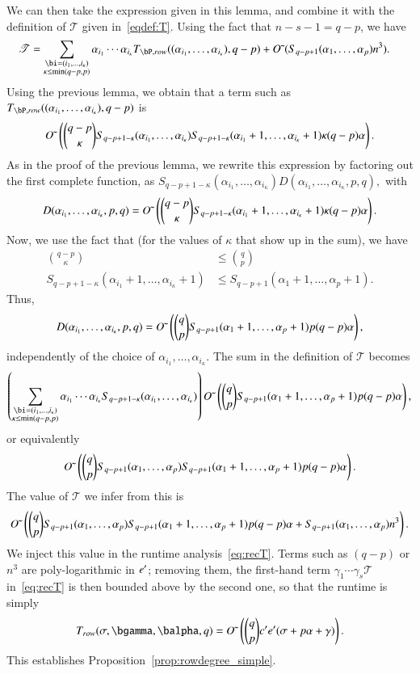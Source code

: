 \documentclass[amsthm]{elsart}
\begin{document}
We can then take the expression given in this lemma, and combine it
with the definition of $\mathscr{T}$ given in~\eqref{eqdef:T}. Using  the fact that
$n-s-1 = q-p$, we have
\begin{align*}
\mathscr{T}&=\sum_{\substack{\bi=(i_1,\dots,i_\kappa)\\ \kappa\le\min(q-p,p)}}
\alpha_{i_1} \cdots \alpha_{i_\kappa} T_{\bP,{\rm row}}((\alpha_{i_1},\dots,\alpha_{i_\kappa}), q-p)
+
\softO( S_{q-p+1}(\alpha_1,\dots,\alpha_p) n^3).
\end{align*}
Using the previous lemma,
we obtain that a term such as $T_{\bP,{\rm row}}((\alpha_{i_1},\dots,\alpha_{i_\kappa}),q-p)$
is
$$
 {O}{\,\tilde{ }\,}\left ({q-p \choose \kappa} 
S_{q-p+1-\kappa}(\alpha_{i_1},\dots,\alpha_{i_\kappa}) 
S_{q-p+1-\kappa}(\alpha_{i_1}+1,\dots,\alpha_{i_\kappa}+1) \kappa (q-p) \alpha \right ).$$
As in the proof of the previous lemma,  we rewrite this expression by
factoring out the first complete function, as
$S_{q-p+1-\kappa}(\alpha_{i_1},\dots,\alpha_{i_\kappa}) D(\alpha_{i_1},\dots,\alpha_{i_\kappa},p,q),$ with
$$
D(\alpha_{i_1},\dots,\alpha_{i_\kappa},p,q)= {O}{\,\tilde{ }\,}\left ({q-p \choose \kappa} 
 S_{q-p+1-\kappa}(\alpha_{i_1}+1,\dots,\alpha_{i_\kappa}+1) \kappa (q-p) \alpha \right ).$$
Now, we use the fact that (for the values of $\kappa$ that show up
in the sum), we have
\begin{align*}
{q-p \choose \kappa} & \le {q \choose p}\\
S_{q-p+1-\kappa}(\alpha_{i_1}+1,\dots,\alpha_{i_\kappa}+1) & \le S_{q-p+1}(\alpha_{1}+1,\dots,\alpha_{p}+1).
\end{align*}
Thus, 
$$
D(\alpha_{i_1},\dots,\alpha_{i_\kappa},p,q)= {O}{\,\tilde{ }\,}\left ( 
{q \choose p}  S_{q-p+1}(\alpha_{1}+1,\dots,\alpha_{p}+1) p(q-p)\alpha\right ),$$
independently of the choice of $\alpha_{i_1},\dots,\alpha_{i_\kappa}$.
The sum in the definition of $\mathscr{T}$ becomes
\[
\left(\sum_{\substack{\bi=(i_1,\dots,i_\kappa)\\ \kappa\le\min(q-p,p)}}
\alpha_{i_1} \cdots \alpha_{i_\kappa} 
S_{q-p+1-\kappa}(\alpha_{i_1},\dots,\alpha_{i_\kappa})\right)
\softO\left ( 
{q \choose p}  S_{q-p+1}(\alpha_{1}+1,\dots,\alpha_{p}+1) p(q-p)\alpha\right ),
\]
or equivalently
\[
{O}{\,\tilde{ }\,}\left ( 
{q \choose p}  S_{q-p+1}(\alpha_{1},\dots,\alpha_{p}) S_{q-p+1}(\alpha_{1}+1,\dots,\alpha_{p}+1)p(q-p)\alpha \right ).
\]
The value of $\mathscr{T}$ we infer from this is
\[
{O}{\,\tilde{ }\,}\left ( 
{q \choose p}  S_{q-p+1}(\alpha_{1},\dots,\alpha_{p}) S_{q-p+1}(\alpha_{1}+1,\dots,\alpha_{p}+1)p(q-p)\alpha 
+  S_{q-p+1}(\alpha_{1},\dots,\alpha_{p}) n^3\right ).
\]
We inject this value in the runtime analysis~\eqref{eq:recT}. Terms
such as $(q-p)$ or $n^3$ are poly-logarithmic in ${e'}{}$; removing them,
the first-hand term $\gamma_1 \cdots \gamma_s \mathscr{T}$ in~\eqref{eq:recT} is
then bounded above by the second one, so that the runtime is simply
\begin{align}\label{eq:recTT}
  T_{\rm row}(\sigma,\bgamma,\balpha,q)=  \softO\left (  {q \choose p}  \rc  \re ( \sigma + p \alpha +\gamma )  \right ).
\end{align}
This establishes Proposition~\ref{prop:rowdegree_simple}.
\end{document}
